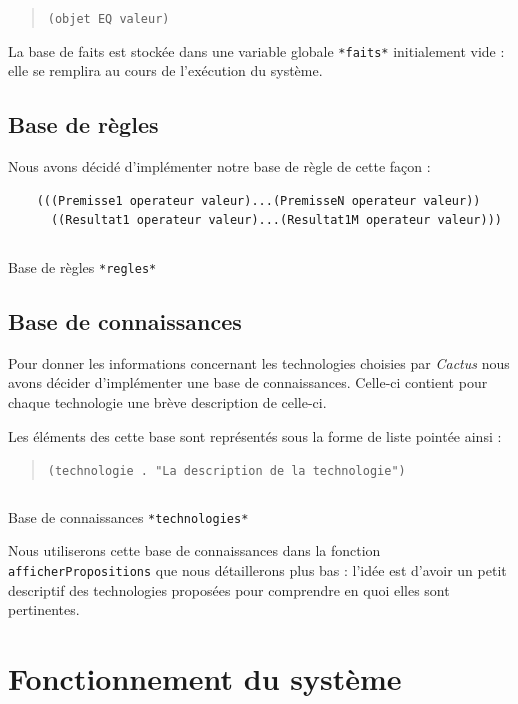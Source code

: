 \documentclass[a4paper,12pt]{article}
\begin{document}
\begin{quotation}
	\texttt{(objet EQ valeur)}
\end{quotation}

La base de faits est stockée dans une variable globale \texttt{*faits*} initialement vide : elle se remplira au cours de l'exécution du système.

\subsection{Base de règles}
Nous avons décidé d'implémenter notre base de règle de cette façon : 

\begin{verbatim}
	(((Premisse1 operateur valeur)...(PremisseN operateur valeur))
  	  ((Resultat1 operateur valeur)...(Resultat1M operateur valeur)))
\end{verbatim}

\begin{listing}[H]
	\centering
	\inputminted[breaklines=true,linenos]{lisp}{../regles.lisp}
	\caption{Base de règles \texttt{*regles*}}
\end{listing}

\subsection{Base de connaissances}
Pour donner les informations concernant les technologies choisies par \textit{Cactus} nous avons décider d'implémenter une base de connaissances. Celle-ci contient pour chaque technologie une brève description de celle-ci.

Les éléments des cette base sont représentés sous la forme de liste pointée ainsi :

\begin{quotation}
	\texttt{(technologie . "La description de la technologie")}
\end{quotation}

\begin{listing}[H]
	\centering
	\inputminted[breaklines=true,linenos]{lisp}{../technologies.lisp}
	\caption{Base de connaissances \texttt{*technologies*}}
\end{listing}

Nous utiliserons cette base de connaissances dans la fonction \texttt{afficherPropositions} que nous détaillerons plus bas : l'idée est d'avoir un petit descriptif des technologies proposées pour comprendre en quoi elles sont pertinentes.


\section{Fonctionnement du système}
\end{document}
